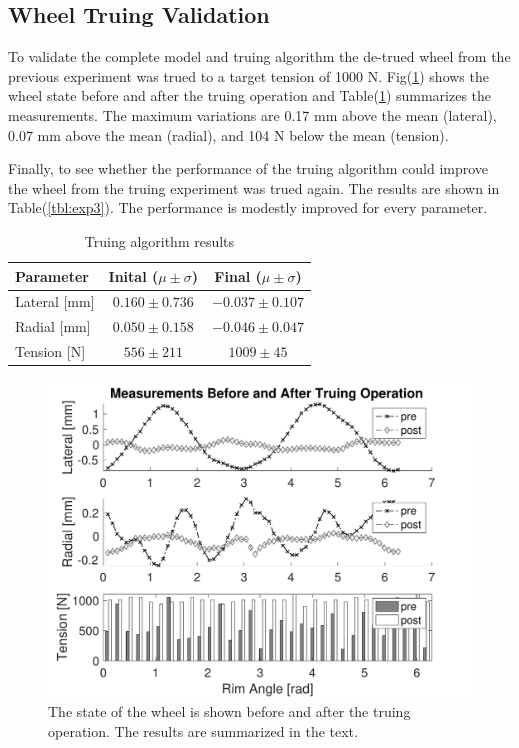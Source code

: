 \documentclass[journal]{IEEEtran}
\begin{document}
\subsection{Wheel Truing Validation}
To validate the complete model and truing algorithm the de-trued wheel from the previous experiment was trued to a target tension of 1000 N. Fig(\ref{fig:exp2}) shows the wheel state before and after the truing operation and Table(\ref{tbl:exp2}) summarizes the measurements. The maximum variations are 0.17 mm above the mean (lateral), 0.07 mm above the mean (radial), and 104 N below the mean (tension). 

Finally, to see whether the performance of the truing algorithm could improve the wheel from the truing experiment was trued again.  The results are shown in Table(\ref{tbl:exp3}). The performance is modestly improved for every parameter.

\begin{table}[!t]
\caption{Truing algorithm results}
\label{tbl:exp2}
\centering
\begin{tabular}{| l | c | c |}
    \hline
    Parameter & Inital ($\mu \pm \sigma$) & Final ($\mu \pm \sigma$)\\ \hline
    Lateral [mm] & $0.160\pm0.736$ &$-0.037\pm 0.107$ \\ \hline 
    Radial [mm] &$0.050\pm0.158$& $-0.046\pm0.047$ \\ \hline 
    Tension [N] &$556\pm211$& $1009\pm45$ \\ \hline
\end{tabular}
\end{table}

\begin{figure}[!t]
\centering
\includegraphics[width=3.25 in]{./figs/exp2}
\caption{The state of the wheel is shown before and after the truing operation. The results are summarized in the text.}
\label{fig:exp2}
\end{figure}
\end{document}
